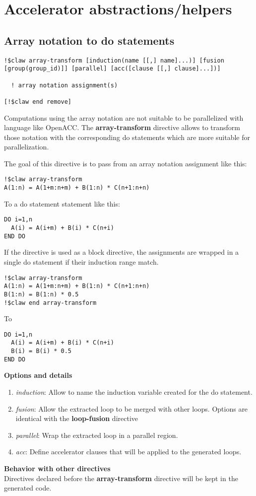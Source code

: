 \section{Accelerator abstractions/helpers}

\subsection{Array notation to do statements}

\begin{lstlisting}
!$claw array-transform [induction(name [[,] name]...)] [fusion [group(group_id)]] [parallel] [acc([clause [[,] clause]...])]

  ! array notation assignment(s) 
  
[!$claw end remove]
\end{lstlisting}

Computations using the array notation are not suitable to be parallelized with
language like OpenACC. The \textbf{array-transform} directive allows to transform those
notation with the corresponding do statements which are more suitable for
parallelization.

The goal of this directive is to pass from an array notation assignment like
this:

\begin{lstlisting}
!$claw array-transform
A(1:n) = A(1+m:n+m) + B(1:n) * C(n+1:n+n)
\end{lstlisting}

To a do statement statement like this:

\begin{lstlisting}
DO i=1,n
  A(i) = A(i+m) + B(i) * C(n+i)
END DO
\end{lstlisting}

If the directive is used as a block directive, the assignments are wrapped in
a single do statement if their induction range match.

\begin{lstlisting}
!$claw array-transform
A(1:n) = A(1+m:n+m) + B(1:n) * C(n+1:n+n)
B(1:n) = B(1:n) * 0.5
!$claw end array-transform
\end{lstlisting}

To

\begin{lstlisting}
DO i=1,n
  A(i) = A(i+m) + B(i) * C(n+i)
  B(i) = B(i) * 0.5
END DO
\end{lstlisting}


\textbf{Options and details}
\begin{enumerate}
\item \textit{induction}: Allow to name the induction variable created for the do statement.
\item \textit{fusion}: Allow the extracted loop to be merged with other loops. Options 
are identical with the \textbf{loop-fusion} directive
\item \textit{parallel}: Wrap the extracted loop in a parallel region.
\item \textit{acc}: Define accelerator clauses that will be applied to the generated loops.
\end{enumerate}

\textbf{Behavior with other directives}\\
Directives declared before the \textbf{array-transform} directive will be kept in the
generated code.